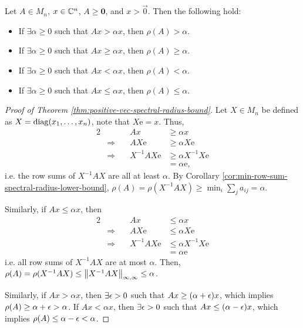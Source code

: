 \begin{theorem}
\label{thm:positive-vec-spectral-radius-bound}
Let $A \in M_n$, $x \in \mathbb C^n$, $A \ge \mathbf{0}$, and $x > \Vec{0}$. Then the following hold:
\begin{itemize}
    \item If $\exists \alpha \ge 0$ such that $Ax > \alpha x$, then $\rho(A) > \alpha$.
    \item If $\exists \alpha \ge 0$ such that $Ax \ge \alpha x$, then $\rho(A) \ge \alpha$.
    \item If $\exists \alpha \ge 0$ such that $Ax < \alpha x$, then $\rho(A) < \alpha$.
    \item If $\exists \alpha \ge 0$ such that $Ax \le \alpha x$, then $\rho(A) \le \alpha$.
\end{itemize}
\end{theorem}
\begin{proof}[Proof of Theorem \ref{thm:positive-vec-spectral-radius-bound}]
Let $X \in M_n$ be defined as $X = \operatorname{diag}(x_1, \dots, x_n)$, note that $X\mathrm{e} = x$. Thus,
\begin{alignat*}{2}
    && Ax &\ge \alpha x \\
    & \Longrightarrow\quad& AX\mathrm{e} &\ge \alpha X\mathrm{e} \\
    & \Longrightarrow\quad& X^{-1}AX\mathrm{e} &\ge \alpha X^{-1}X\mathrm{e} \\
    &&&=\alpha\mathrm{e},
\end{alignat*}
i.e. the row sums of $X^{-1}AX$ are all at least $\alpha$. By Corollary \ref{cor:min-row-sum-spectral-radius-lower-bound}, $\rho(A) = \rho(X^{-1}AX) \ge \min_i \sum_j a_{ij} = \alpha$. 

Similarly, if $Ax \le \alpha x$, then
\begin{alignat*}{2}
    && Ax &\le \alpha x \\
    & \Longrightarrow\quad& AX\mathrm{e} &\le \alpha X\mathrm{e} \\
    & \Longrightarrow\quad& X^{-1}AX\mathrm{e} &\le \alpha X^{-1}X\mathrm{e} \\
    &&&=\alpha\mathrm{e}
\end{alignat*}
i.e. all row sums of $X^{-1}AX$ are at most $\alpha$. Then, $\rho(A) = \rho(X^{-1}AX) \le \left\lVert X^{-1}AX\right\rVert_{\infty,\infty} \le \alpha$.

Similarly, if $Ax > \alpha x$, then $\exists \epsilon>0$ such that $Ax \ge (\alpha+\epsilon)x$, which implies $\rho(A) \ge \alpha+\epsilon > \alpha$. If $Ax < \alpha x$, then $\exists\epsilon > 0$ such that $Ax \le (\alpha-\epsilon)x$, which implies $\rho(A) \le \alpha-\epsilon < \alpha$.
\end{proof}


